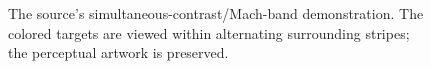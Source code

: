 \begin{figure}[!htbp]
\centering
{}
\caption{The source's simultaneous-contrast/Mach-band demonstration. The colored targets are viewed within alternating surrounding stripes; the perceptual artwork is preserved.}
\label{fig:simultaneous-contrast}
\end{figure}
